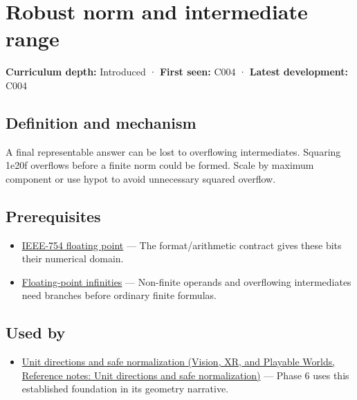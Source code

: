 \hypertarget{appendix-7f1e17dcafb1}{}\label{referencestart:appendix-7f1e17dcafb1}
\section{Robust norm and intermediate range}\label{appendix-7f1e17dcafb1-robust-norm-and-intermediate-range}

\textbf{Curriculum depth:} Introduced · \textbf{First seen:} C004 · \textbf{Latest development:} C004

\begin{allmightroledefinition}

\subsection{Definition and mechanism}\label{appendix-7f1e17dcafb1-definition-and-mechanism}

A final representable answer can be lost to overflowing intermediates. Squaring 1e20f overflows before a finite norm could be formed. Scale by maximum component or use hypot to avoid unnecessary squared overflow.

\end{allmightroledefinition}

\subsection{Prerequisites}\label{appendix-7f1e17dcafb1-prerequisites}

\begin{itemize}
\tightlist
\item
  \hyperref[appendix-343615f49ddf]{IEEE-754 floating point} --- The format/arithmetic contract gives these bits their numerical domain.
\item
  \hyperref[appendix-eb336149c00a]{Floating-point infinities} --- Non-finite operands and overflowing intermediates need branches before ordinary finite formulas.
\end{itemize}

\subsection{Used by}\label{appendix-7f1e17dcafb1-used-by}

\begin{itemize}
\tightlist
\item
  \href{../07-Vision-XR-and-Playable-Worlds/main.pdf\#nameddest=appendix-f744e41b95b4}{Unit directions and safe normalization (Vision, XR, and Playable Worlds, Reference notes: Unit directions and safe normalization)} --- Phase 6 uses this established foundation in its geometry narrative.
\end{itemize}

